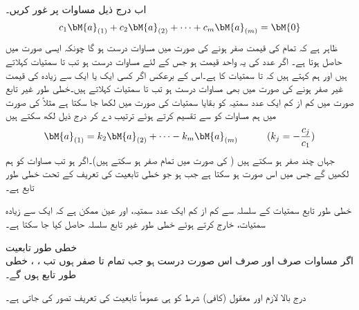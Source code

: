 اب درج ذیل مساوات پر غور کریں۔
\begin{align}\label{مساوات_الجبرا_غیر_تابعیت_الف}
c_1\bM{a}_{(1)}+c_2\bM{a}_{(2)}+\cdots+c_m\bM{a}_{(m)}=\bM{0}
\end{align}
ظاہر ہے کہ تمام  کی قیمت صفر ہونے کی صورت میں مساوات  درست ہو گا چونکہ ایسی صورت میں  حاصل ہوتا ہے۔ اگر  عدد  کی یہ واحد قیمت ہو جس کے لئے مساوات  درست ہو تب  تا  سمتیات  کہلاتے ہیں اور ہم کہتے ہیں کہ   تا  سمتیات کا  ہے۔اس کے برعکس اگر کسی ایک یا ایک سے زیادہ  کی قیمت غیر صفر ہونے کی صورت میں بھی مساوات  درست ہو تب  تا  سمتیات  کہلاتے ہیں۔خطی طور غیر تابع صورت میں کم از کم ایک عدد سمتیہ کو بقایا سمتیات کی صورت میں لکھا جا سکتا ہے مثلاً  کی صورت میں ہم مساوات  کو  سے تقسیم کرتے ہوئے ترتیب دے کر درج ذیل لکھ سکتے ہیں
\begin{align*}
\bM{a}_{(1)}=k_2\bM{a}_{(2)}+\cdots-k_m\bM{a}_{(m)}   \quad \quad\quad (k_j=-\frac{c_j}{c_1})
\end{align*}
جہاں چند  صفر ہو سکتے ہیں ( کی صورت میں تمام  صفر ہو سکتے ہیں)۔اگر  ہو تب  مساوات  کو ہم  لکھیں گے جس میں  اس صورت ہو سکتا ہے جب  ہو جو خطی تابعیت کی تعریف کے تحت خطی طور تابع ہے۔

خطی طور تابع سمتیات کے سلسلہ سے کم از کم ایک عدد سمتیہ، اور عین ممکن ہے کہ ایک سے زیادہ سمتیات، خارج کرتے ہوئے خطی طور غیر تابع سلسلہ حاصل کیا جا سکتا ہے۔

\quad خطی طور تابعیت\\
اگر مساوات  صرف اور صرف  اس صورت درست ہو جب تمام  تا  صفر ہوں تب ، ،  خطی طور تابع ہوں گے۔

درج بالا لازم  اور معقول (کافی) شرط کو ہی عموماً تابعیت کی تعریف تصور کی جاتی ہے۔

